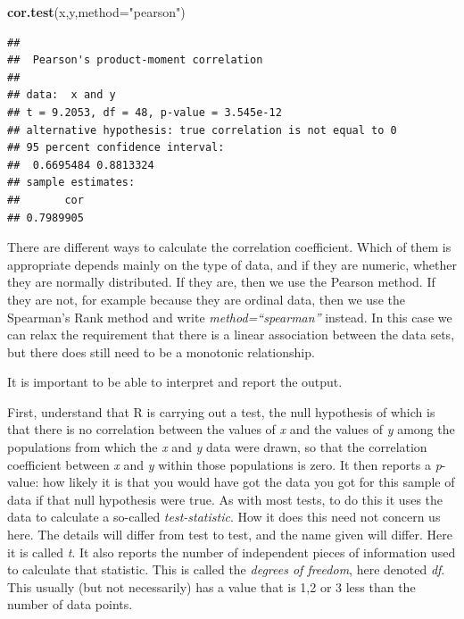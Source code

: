 \documentclass[
]{article}
\newenvironment{Shaded}{\begin{snugshade}}{\end{snugshade}}
\newcommand{\AttributeTok}[1]{\textcolor[rgb]{0.13,0.29,0.53}{#1}}
\newcommand{\FunctionTok}[1]{\textcolor[rgb]{0.13,0.29,0.53}{\textbf{#1}}}
\newcommand{\NormalTok}[1]{#1}
\newcommand{\StringTok}[1]{\textcolor[rgb]{0.31,0.60,0.02}{#1}}
\begin{document}
\begin{Shaded}
\begin{Highlighting}[]
\FunctionTok{cor.test}\NormalTok{(x,y,}\AttributeTok{method=}\StringTok{"pearson"}\NormalTok{)}
\end{Highlighting}
\end{Shaded}

\begin{verbatim}
## 
##  Pearson's product-moment correlation
## 
## data:  x and y
## t = 9.2053, df = 48, p-value = 3.545e-12
## alternative hypothesis: true correlation is not equal to 0
## 95 percent confidence interval:
##  0.6695484 0.8813324
## sample estimates:
##       cor 
## 0.7989905
\end{verbatim}

There are different ways to calculate the correlation coefficient. Which
of them is appropriate depends mainly on the type of data, and if they
are numeric, whether they are normally distributed. If they are, then we
use the Pearson method. If they are not, for example because they are
ordinal data, then we use the Spearman's Rank method and write
\emph{method=``spearman''} instead. In this case we can relax the
requirement that there is a linear association between the data sets,
but there does still need to be a monotonic relationship.

It is important to be able to interpret and report the output.

First, understand that R is carrying out a test, the null hypothesis of
which is that there is no correlation between the values of \emph{x} and
the values of \emph{y} among the populations from which the \emph{x} and
\emph{y} data were drawn, so that the correlation coefficient between
\emph{x} and \emph{y} within those populations is zero. It then reports
a \emph{p}-value: how likely it is that you would have got the data you
got for this sample of data if that null hypothesis were true. As with
most tests, to do this it uses the data to calculate a so-called
\emph{test-statistic}. How it does this need not concern us here. The
details will differ from test to test, and the name given will differ.
Here it is called \emph{t}. It also reports the number of independent
pieces of information used to calculate that statistic. This is called
the \emph{degrees of freedom}, here denoted \emph{df}. This usually (but
not necessarily) has a value that is 1,2 or 3 less than the number of
data points.
\end{document}
